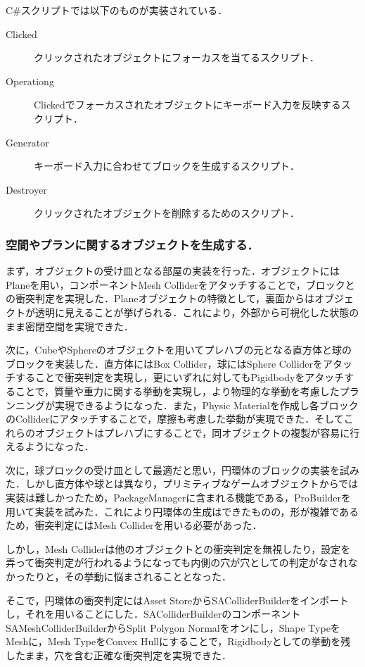 \documentclass[12pt]{jarticle}
\begin{document}
C\#スクリプトでは以下のものが実装されている．
\begin{description}
\item[Clicked] クリックされたオブジェクトにフォーカスを当てるスクリプト．
\item[Operationg] Clickedでフォーカスされたオブジェクトにキーボード入力を反映するスクリプト．
\item[Generator] キーボード入力に合わせてブロックを生成するスクリプト．
\item[Destroyer] クリックされたオブジェクトを削除するためのスクリプト．
\end{description}

\subsubsection{空間やプランに関するオブジェクトを生成する．}
まず，オブジェクトの受け皿となる部屋の実装を行った．オブジェクトにはPlaneを用い，コンポーネントMesh Colliderをアタッチすることで，ブロックとの衝突判定を実現した．Planeオブジェクトの特徴として，裏面からはオブジェクトが透明に見えることが挙げられる．これにより，外部から可視化した状態のまま密閉空間を実現できた．

次に，CubeやSphereのオブジェクトを用いてプレハブの元となる直方体と球のブロックを実装した．直方体にはBox Collider，球にはSphere Colliderをアタッチすることで衝突判定を実現し，更にいずれに対してもPigidbodyをアタッチすることで，質量や重力に関する挙動を実現し，より物理的な挙動を考慮したプランニングが実現できるようになった．また，Physic Materialを作成し各ブロックのColliderにアタッチすることで，摩擦も考慮した挙動が実現できた．そしてこれらのオブジェクトはプレハブにすることで，同オブジェクトの複製が容易に行えるようになった．

次に，球ブロックの受け皿として最適だと思い，円環体のブロックの実装を試みた．しかし直方体や球とは異なり，プリミティブなゲームオブジェクトからでは実装は難しかったため，PackageManagerに含まれる機能である，ProBuilderを用いて実装を試みた．これにより円環体の生成はできたものの，形が複雑であるため，衝突判定にはMesh Colliderを用いる必要があった．

しかし，Mesh Colliderは他のオブジェクトとの衝突判定を無視したり，設定を弄って衝突判定が行われるようになっても内側の穴が穴としての判定がなされなかったりと，その挙動に悩まされることとなった．

そこで，円環体の衝突判定にはAsset StoreからSAColliderBuilderをインポートし，それを用いることにした．SAColliderBuilderのコンポーネントSAMeshColliderBuilderからSplit Polygon Normalをオンにし，Shape TypeをMeshに，Mesh TypeをConvex Hullにすることで，Rigidbodyとしての挙動を残したまま，穴を含む正確な衝突判定を実現できた．
\end{document}
